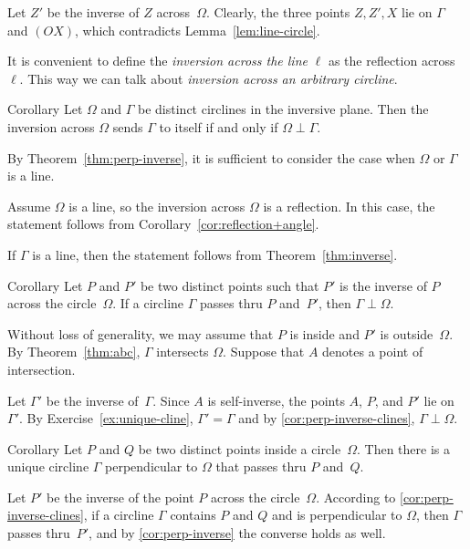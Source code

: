 Let $Z'$ be the inverse of $Z$ across~$\Omega$.
Clearly, the three points $Z, Z', X$ lie on $\Gamma$ and $(OX)$, which contradicts Lemma~\ref{lem:line-circle}.
\qeds 

It is convenient to define the 
\emph{inversion across the line} $\ell$
as the reflection across $\ell$.
This way we can talk about \emph{inversion across an arbitrary circline}.

\begin{thm}{Corollary}\label{cor:perp-inverse-clines}
Let $\Omega$  and $\Gamma$ be distinct circlines in the inversive plane.
Then
the inversion across $\Omega$ sends $\Gamma$ to itself if and only if $\Omega\perp\Gamma$.
\end{thm}

By Theorem~\ref{thm:perp-inverse}, it is sufficient to consider the case when $\Omega$ or $\Gamma$ is a line.

Assume $\Omega$ is a line, so the inversion across $\Omega$ is a reflection.
In this case, the statement follows from Corollary~\ref{cor:reflection+angle}.

If $\Gamma$ is a line, 
then the statement follows from Theorem~\ref{thm:inverse}.
\qeds

\begin{thm}{Corollary}\label{cor:perp-inverse}
Let $P$ and $P'$ be two distinct points
such that $P'$ is the inverse of $P$ across the circle~$\Omega$.
If a circline $\Gamma$ passes thru $P$ and~$P'$, then $\Gamma\perp\Omega$.
\end{thm}

Without loss of generality, we may assume that $P$ is inside and $P'$ is outside~$\Omega$.
By Theorem~\ref{thm:abc}, $\Gamma$ intersects $\Omega$.
Suppose that $A$ denotes a point of intersection.

Let $\Gamma'$ be the inverse of~$\Gamma$.
Since $A$ is self-inverse, the points $A$, $P$, and $P'$ lie on~$\Gamma'$.
By Exercise~\ref{ex:unique-cline},
$\Gamma'=\Gamma$
and by \ref{cor:perp-inverse-clines}, $\Gamma\perp\Omega$.
\qeds

\begin{thm}{Corollary}\label{cor:h-line} 
Let $P$ and $Q$ be two distinct points inside a circle~$\Omega$.
Then there is a unique circline $\Gamma$ perpendicular to $\Omega$ that passes thru $P$ and~$Q$.  
\end{thm}

Let $P'$ be the inverse of the point $P$ across the circle~$\Omega$.
According to \ref{cor:perp-inverse-clines},
if a circline $\Gamma$ contains $P$ and $Q$ and is perpendicular to $\Omega$, then $\Gamma$ passes thru~$P'$, and by \ref{cor:perp-inverse} the converse holds as well.

